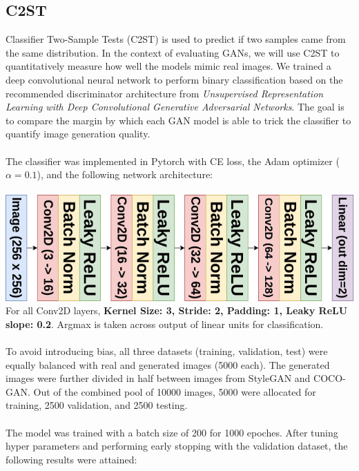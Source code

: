 \documentclass[12pt]{article}
\begin{document}
\begin{multicols*}{2}
        \subsection{C2ST}
        \label{subsec:c2st}
        Classifier Two-Sample Tests (C2ST) is used to predict if two samples came from the same distribution\cite{c2st}.
        In the context of evaluating GANs, we will use C2ST to quantitatively measure how well the models mimic real images.
        We trained a deep convolutional neural network to perform binary classification based on the recommended discriminator architecture from \textit{Unsupervised Representation Learning
with Deep Convolutional Generative Adversarial Networks}\cite{dcgan}.
        The goal is to compare the margin by which each GAN model is able to trick the classifier to quantify image generation quality.
        \\\\
        The classifier was implemented in Pytorch with CE loss, the Adam optimizer ($\alpha=0.1$), and the following network architecture:\\\\
        \includegraphics[scale=0.35]{c2st-diagram.png}\\
        For all Conv2D layers, \textbf{Kernel Size: 3, Stride: 2, Padding: 1, Leaky ReLU slope: 0.2}.
        Argmax is taken across output of linear units for classification.
        \\\\
        To avoid introducing bias, all three datasets (training, validation, test) were equally balanced with real and generated images (5000 each).
        The generated images were further divided in half between images from StyleGAN and COCO-GAN.
        Out of the combined pool of 10000 images, 5000 were allocated for training, 2500 validation, and 2500 testing.
        \\\\
        The model was trained with a batch size of 200 for 1000 epoches.
        After tuning hyper parameters and performing early stopping with the validation dataset, the following results were attained:
        \\


\end{multicols*}
\end{document}
